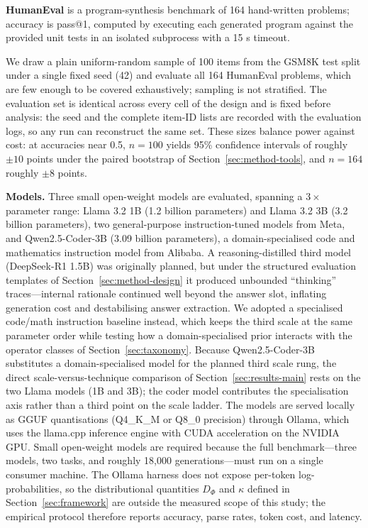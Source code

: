 \documentclass[conference]{IEEEtran}
\begin{document}
\textbf{HumanEval} \cite{b20} is a program-synthesis benchmark of 164
hand-written problems; accuracy is pass@1, computed by executing each
generated program against the provided unit tests in an isolated
subprocess with a 15 s timeout.

We draw a plain uniform-random sample of 100 items from the GSM8K
test split under a single fixed seed (42) and evaluate all 164
HumanEval problems, which are few enough to be covered exhaustively;
sampling is not stratified.  The evaluation set is identical across
every cell of the design and is fixed before analysis: the seed and
the complete item-ID lists are recorded with the evaluation logs, so
any run can reconstruct the same set.  These sizes balance power
against cost: at accuracies near 0.5, $n = 100$ yields 95\% confidence
intervals of roughly $\pm 10$ points under the paired bootstrap of
Section~\ref{sec:method-tools}, and $n = 164$ roughly $\pm 8$ points.

\textbf{Models.}  Three small open-weight models are evaluated, spanning
a $3\times$ parameter range: Llama 3.2 1B (1.2 billion parameters)
and Llama 3.2 3B (3.2 billion parameters), two general-purpose
instruction-tuned models from Meta, and Qwen2.5-Coder-3B (3.09
billion parameters), a domain-specialised code and mathematics
instruction model from Alibaba.  A reasoning-distilled third model
(DeepSeek-R1 1.5B) was originally planned, but under the structured
evaluation templates of Section~\ref{sec:method-design} it produced
unbounded ``thinking'' traces---internal rationale continued well
beyond the answer slot, inflating generation cost and destabilising
answer extraction.  We adopted a specialised code/math instruction baseline instead,
which keeps the third scale at the same parameter order while testing
how a domain-specialised prior interacts with the operator classes of
Section~\ref{sec:taxonomy}.  Because
Qwen2.5-Coder-3B substitutes a domain-specialised model for the
planned third scale rung, the direct scale-versus-technique comparison
of Section~\ref{sec:results-main} rests on the two Llama models (1B
and 3B); the coder model contributes the specialisation axis rather
than a third point on the scale ladder.  The models are served locally
as GGUF quantisations (Q4\_K\_M or Q8\_0 precision) through Ollama,
which uses the llama.cpp inference engine with CUDA acceleration on
the NVIDIA GPU.  Small open-weight models are required because the
full benchmark---three models, two tasks, and roughly 18,000
generations---must run on a single consumer machine.  The Ollama
harness does not expose per-token log-probabilities, so the
distributional quantities $D_{\Phi}$ and $\kappa$ defined in
Section~\ref{sec:framework} are outside the measured scope of this
study; the empirical protocol therefore reports accuracy, parse
rates, token cost, and latency.
\end{document}
